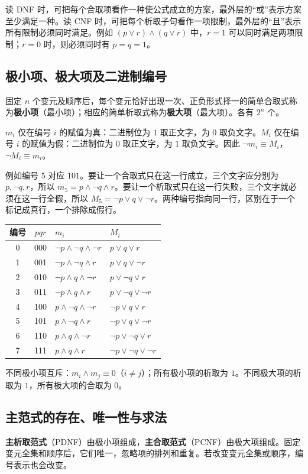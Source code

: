 \documentclass[UTF8,fontset=none,zihao=-4,a4paper]{ctexart}
\newcommand{\term}[1]{\textbf{#1}}
\begin{document}
读 DNF 时，可把每个合取项看作一种使公式成立的方案，最外层的“或”表示方案至少满足一种。读 CNF 时，可把每个析取子句看作一项限制，最外层的“且”表示所有限制必须同时满足。例如 $(p\lor r)\land(q\lor r)$ 中，$r=1$ 可以同时满足两项限制；$r=0$ 时，则必须同时有 $p=q=1$。

\subsection{极小项、极大项及二进制编号}
固定 $n$ 个变元及顺序后，每个变元恰好出现一次、正负形式择一的简单合取式称为\term{极小项}（最小项）；相应的简单析取式称为\term{极大项}（最大项）。各有 $2^n$ 个。

$m_i$ 仅在编号 $i$ 的赋值为真：二进制位为 $1$ 取正文字，为 $0$ 取负文字。$M_i$ 仅在编号 $i$ 的赋值为假：二进制位为 $0$ 取正文字，为 $1$ 取负文字。因此 $\neg m_i\equiv M_i$，$\neg M_i\equiv m_i$。

例如编号 $5$ 对应 $101$。要让一个合取式只在这一行成立，三个文字应分别为 $p,\neg q,r$，所以 $m_5=p\land\neg q\land r$。要让一个析取式只在这一行失败，三个文字就必须在这一行全假，所以 $M_5=\neg p\lor q\lor\neg r$。两种编号指向同一行，区别在于一个标记成真行，一个排除成假行。
\begin{center}
\begin{tabular}{c c l l}
\toprule 编号 & $pqr$ & $m_i$ & $M_i$\\\midrule
0&000&$\neg p\land\neg q\land\neg r$&$p\lor q\lor r$\\
1&001&$\neg p\land\neg q\land r$&$p\lor q\lor\neg r$\\
2&010&$\neg p\land q\land\neg r$&$p\lor\neg q\lor r$\\
3&011&$\neg p\land q\land r$&$p\lor\neg q\lor\neg r$\\
4&100&$p\land\neg q\land\neg r$&$\neg p\lor q\lor r$\\
5&101&$p\land\neg q\land r$&$\neg p\lor q\lor\neg r$\\
6&110&$p\land q\land\neg r$&$\neg p\lor\neg q\lor r$\\
7&111&$p\land q\land r$&$\neg p\lor\neg q\lor\neg r$\\\bottomrule
\end{tabular}
\end{center}
不同极小项互斥：$m_i\land m_j\equiv0$（$i\ne j$）；所有极小项的析取为 $1$。不同极大项的析取为 $1$，所有极大项的合取为 $0$。

\subsection{主范式的存在、唯一性与求法}
\term{主析取范式}（PDNF）由极小项组成，\term{主合取范式}（PCNF）由极大项组成。固定变元全集和顺序后，它们唯一，忽略项的排列和重复。若改变变元全集或顺序，编号表示也会改变。
\end{document}
